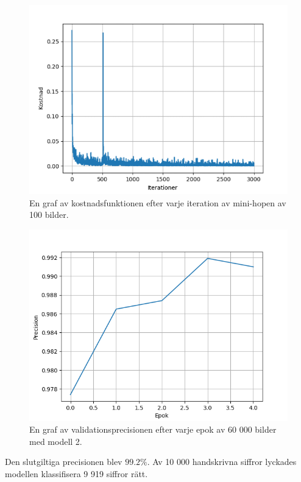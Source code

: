 \documentclass[a4paper,11pt,twoside]{article}
\begin{document}
\begin{figure}[h]\label{figkosnadmnist}
	\centering
  		\includegraphics[scale=0.6]{kostandsplot.png}
  	\caption{En graf av kostnadsfunktionen efter varje iteration av mini-hopen av 100 bilder.}
\end{figure}
\begin{figure}[h]\label{figepokmnist}
	\centering
  		\includegraphics[scale=0.6]{epokplot.png}
  	\caption{En graf av validationsprecisionen efter varje epok av 60 000 bilder med modell 2.}
\end{figure}

Den slutgiltiga precisionen blev $99.2\%$. Av 10 000 handskrivna siffror lyckades modellen klassifisera 9 919 siffror rätt.
\end{document}
